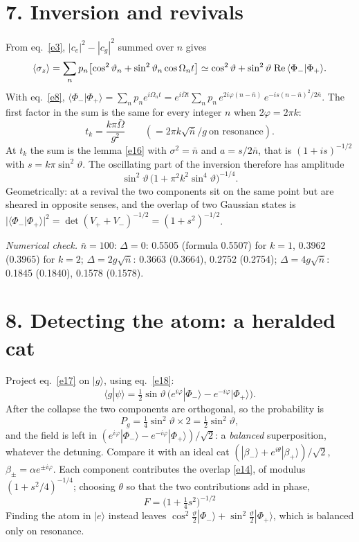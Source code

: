 \documentclass[11pt,letterpaper]{article}
\newcommand{\nbar}{\bar{n}}
\newcommand{\Obar}{\bar{\Omega}}
\newcommand{\ket}[1]{|#1\rangle}
\newcommand{\braket}[2]{\langle#1|#2\rangle}
\newcommand{\numcheck}[1]{\par{\small\textit{Numerical check.} #1}\par}
\begin{document}
\section*{7. Inversion and revivals}
From eq.~\eqref{e3}, $|c_{e}|^2-|c_{g}|^2$ summed over $n$ gives
\begin{equation}\label{e21}
\langle\sigma_z\rangle=\sum_np_n\bigl[\cos^2\vartheta_n+\sin^2\vartheta_n\cos\Omega_nt\bigr]
\simeq\cos^2\vartheta+\sin^2\vartheta\;{\rm Re}\,\braket{\Phi_-}{\Phi_+}.
\end{equation}
With eq.~\eqref{e8}, $\braket{\Phi_-}{\Phi_+}=\sum_np_ne^{i\Omega_nt}
=e^{i\Obar t}\sum_np_n\,e^{2i\varphi(n-\nbar)}\,e^{-is(n-\nbar)^2/2\nbar}$. The first factor in the sum
is the same for every integer $n$ when $2\varphi=2\pi k$:
\begin{equation}\label{e22}
t_k=\frac{k\pi\Obar}{g^2}\qquad(=2\pi k\sqrt{\nbar}/g\ \text{on resonance}).
\end{equation}
At $t_k$ the sum is the lemma \eqref{e16} with $\sigma^2=\nbar$ and $a=s/2\nbar$, that is $(1+is)^{-1/2}$
with $s=k\pi\sin^2\vartheta$. The oscillating part of the inversion therefore has amplitude
\begin{equation}\label{e23}
\sin^2\vartheta\,\bigl(1+\pi^2k^2\sin^4\vartheta\bigr)^{-1/4}.
\end{equation}
Geometrically: at a revival the two components sit on the same point but are sheared in opposite
senses, and the overlap of two Gaussian states is $|\braket{\Phi_-}{\Phi_+}|^2=\det(V_++V_-)^{-1/2}=(1+s^2)^{-1/2}$.
\numcheck{$\nbar=100$: $\Delta=0$: 0.5505 (formula 0.5507) for $k=1$, 0.3962 (0.3965) for $k=2$;
$\Delta=2g\sqrt{\nbar}$: 0.3663 (0.3664), 0.2752 (0.2754); $\Delta=4g\sqrt{\nbar}$: 0.1845 (0.1840), 0.1578 (0.1578).}

\section*{8. Detecting the atom: a heralded cat}
Project eq.~\eqref{e17} on $\ket{g}$, using eq.~\eqref{e18}:
\begin{equation}\label{e24}
\braket{g}{\psi}=\tfrac12\sin\vartheta\,\bigl(e^{i\varphi}\ket{\Phi_-}-e^{-i\varphi}\ket{\Phi_+}\bigr).
\end{equation}
After the collapse the two components are orthogonal, so the probability is
\begin{equation}\label{e25}
P_g=\tfrac14\sin^2\vartheta\times2=\tfrac12\sin^2\vartheta ,
\end{equation}
and the field is left in $(e^{i\varphi}\ket{\Phi_-}-e^{-i\varphi}\ket{\Phi_+})/\sqrt2$: a
\emph{balanced} superposition, whatever the detuning. Compare it with an ideal cat
$(\ket{\beta_-}+e^{i\theta}\ket{\beta_+})/\sqrt2$, $\beta_\pm=\alpha e^{\pm i\varphi}$. Each component
contributes the overlap \eqref{e14}, of modulus $(1+s^2/4)^{-1/4}$; choosing $\theta$ so that the two
contributions add in phase,
\begin{equation}\label{e26}
\boxed{\;F=\bigl(1+\tfrac14s^2\bigr)^{-1/2}\;}
\end{equation}
Finding the atom in $\ket{e}$ instead leaves $\cos^2\tfrac\vartheta2\ket{\Phi_-}+\sin^2\tfrac\vartheta2\ket{\Phi_+}$,
which is balanced only on resonance.
\end{document}
